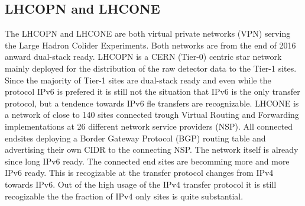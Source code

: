 \subsection{LHCOPN and LHCONE}

The LHCOPN and LHCONE are both virtual private networks (VPN) serving the Large Hadron Colider Experiments. Both networks are from the end of 2016 anward dual-stack ready. LHCOPN is a CERN (Tier-0) centric star network mainly deployed for the distribution of the raw detector data to the Tier-1 sites. Since the majority of Tier-1 sites are dual-stack ready and even while the protocol IPv6 is prefered it is still not the situation that IPv6 is the only transfer protocol, but a tendence towards IPv6 fle transfers are recognizable. LHCONE is a network of close to 140 sites connected trough Virtual Routing and Forwarding implementations at 26 different network service providers (NSP). All connected endsites deploying a Border Gateway Protocol (BGP) routing table and advertising their own CIDR to the connecting NSP. The network itself is already since long IPv6 ready. The connected end sites are becomming more and more IPv6 ready. This is recogizable at the  transfer protocol changes from IPv4 towards IPv6. Out of the high usage of the IPv4 transfer protocol it is still recogizable the the fraction of IPv4 only sites is quite substantial.
